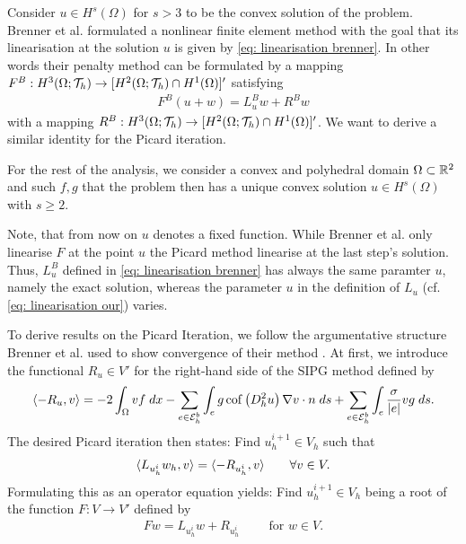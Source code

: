 Consider $u\in H^s(\Omega)$ for $s>3$ to be the convex solution of the \MA problem. Brenner et al. formulated a nonlinear finite element method with the goal that its linearisation at the solution $u$ is given by \eqref{eq: linearisation brenner}. In other words their penalty method can be formulated by a mapping $F^B:H^3(\Omega; \mathcal{T}_h) \rightarrow [H^2(\Omega; \mathcal{T}_h) \cap H^1(\Omega)]'$ satisfying
 \begin{align}
 	F^B(u +w ) = L^B_u w + R^Bw \label{eq: add brenner method}
 \end{align}
 with a mapping $R^B:H^3(\Omega; \mathcal{T}_h) \rightarrow [H^2(\Omega; \mathcal{T}_h) \cap H^1(\Omega)]'$. 
% 
We want to derive a similar identity for the Picard iteration. 

For the rest of the analysis, we consider a convex and polyhedral domain $\Omega\subset \mathbb{R}^2$ and such $f,g$ that the \MA problem then has a unique convex solution $u \in H^s(\Omega)$ with $s\geq 2$. 

Note, that from now on $u$ denotes a fixed function. While Brenner et al. only linearise $F$ at the point $u$ the Picard method linearise at the last step's solution. Thus, $L_u^B$ defined in \eqref{eq: linearisation brenner} has always the same paramter $u$, namely the exact solution, whereas the parameter $u$ in the definition of $L_u$ (cf. \eqref{eq: linearisation our}) varies. 

To derive results on the Picard Iteration, we follow the argumentative structure Brenner et al. used to show convergence of their method \cite{BGN+2011}. At first, we introduce the functional $R_u \in V'$ for the right-hand side of the SIPG method defined by
\[
 \langle -R_u, v \rangle = - 2 \int_{\Omega} {{v f}\;dx}
-\sum\limits_{e \in \mathcal{E}_h^b}\int_{e} {{ g \operatorname{cof} \left( D_h^2 u \right) \nabla v \cdot n }\;ds}
+\sum\limits_{e \in \mathcal{E}_h^b} \int_{e} {{ \frac \sigma {|e|} v g}\;ds}. \label{eq: definition R}
\]
The desired Picard iteration then states: Find $u^{i+1}_h \in V_h$ such that
\begin{align}
 \langle L_{u^i_h} w_h, v \rangle =   \langle -R_{u^i_h}, v \rangle   \qquad \forall v \in V. \label{eq: fixed point functional}
\end{align}
Formulating this as an operator equation yields: Find $u_h^{i+1} \in V_h$ being a root of the function $F:V \rightarrow V'$ defined by
\begin{align}
 {Fw} =  L_{u^i_h} w + R_{u^i_h}  \qquad \text{ for } w \in V. \label{eq: definition F}
\end{align}




